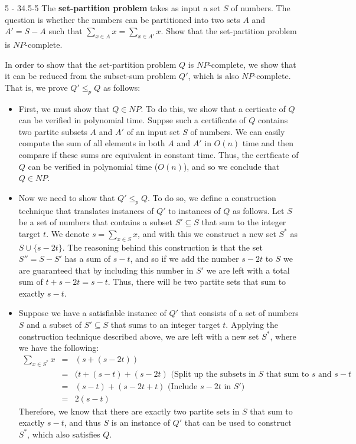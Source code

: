 \documentclass[11pt]{article}
\begin{document}
\begin{prob}{5 - 34.5-5}
The \textbf{set-partition problem} takes as input a set $S$ of numbers. The question is whether the numbers can be partitioned into two sets $A$ and $A' = S - A$ such that $\sum_{x \in A}x = \sum_{x \in A'} x$. Show that the set-partition problem is $NP$-complete.
\end{prob}
\begin{sol}
In order to show that the set-partition problem $Q$ is $NP$-complete, we show that it can be reduced from the subset-sum problem $Q'$, which is also $NP$-complete. That is, we prove $Q' \leq_p Q$ as follows:


\begin{itemize}
	\item First, we must show that $Q \in NP$. To do this, we show that a certicate of $Q$ can be verified in polynomial time. Suppse such a certificate of $Q$ contains two partite subsets $A$ and $A'$ of an input set $S$ of numbers. We can easily compute the sum of all elements in both $A$ and $A'$ in $O(n)$ time and then compare if these sums are equivalent in constant time. Thus, the certficate of $Q$ can be verified in polynomial time ($O(n)$), and so we conclude that $Q \in NP$. 

	\item Now we need to show that $Q' \leq_p Q$. To do so, we define a construction technique that translates instances of $Q'$ to instances of $Q$ as follows. Let $S$ be a set of numbers that contains a subset $S' \subseteq S$ that sum to the integer target $t$. We denote $s = \sum_{x \in S}x$, and with this we construct a new set $S^*$ as $S \cup \{s - 2t\}$. The reasoning behind this construction is that the set $S'' = S - S'$ has a sum of $s - t$, and so if we add the number $s - 2t$ to $S$ we are guaranteed that by including this number in $S'$ we are left with a total sum of $t + s - 2t = s - t$. Thus, there will be two partite sets that sum to exactly $s - t$.

	\item Suppose we have a satisfiable instance of $Q'$ that consists of a set of numbers $S$ and a subset of $S' \subseteq S$ that sums to an integer target $t$. Applying the construction technique described above, we are left with a new set $S^*$, where we have the following:
\begin{eqnarray*}
\sum_{x \in S^*}x &=& (s + (s - 2t))\\
& = & (t + (s - t) + (s - 2t) \text{ (Split up the subsets in $S$ that sum to $s$ and $s - t$}\\
& = & (s - t) + (s - 2t + t) \text{ (Include $s - 2t$ in $S'$)}\\
& = & 2(s - t)
\end{eqnarray*}
Therefore, we know that there are exactly two partite sets in $S$ that sum to exactly $s - t$, and thus $S$ is an instance of $Q'$ that can be used to construct $S^*$, which also satisfies $Q$.


\end{itemize}
\end{sol}
\end{document}
